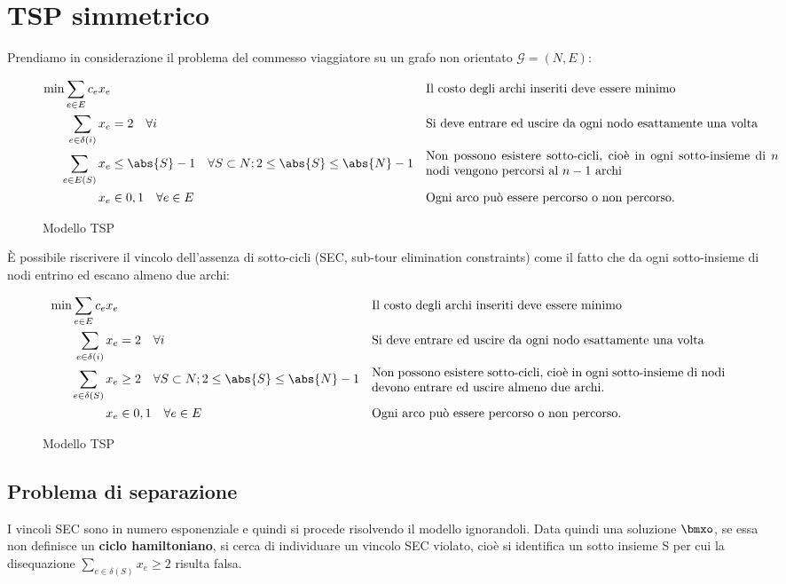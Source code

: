 \documentclass[\main/main.tex]{subfiles}
\begin{document}
\chapter{TSP simmetrico}
Prendiamo in considerazione il problema del commesso viaggiatore su un grafo non orientato \(\mathcal{G}=(N,E)\):
\begin{figure}
    \begin{align*}
        \min \sum_{e\in E} c_e x_e & &&\text{Il costo degli archi inseriti deve essere minimo}\\
        \sum_{e \in \delta(i)} x_e &= 2\quad \forall i &&\text{Si deve entrare ed uscire da ogni nodo esattamente una volta}\\
        \sum_{e \in E(S)} x_e & \leq \abs{S} - 1 \quad \forall S \subset N; 2 \leq \abs{S} \leq \abs{N} -1 && \parbox{10cm}{Non possono esistere sotto-cicli, cioè in ogni sotto-insieme di \(n\) nodi vengono percorsi al \(n-1\) archi}\\
        x_e & \in {0,1} \quad \forall e \in E && \text{Ogni arco può essere percorso o non percorso.}
    \end{align*}
    \caption{Modello TSP}
\end{figure}
È possibile riscrivere il vincolo dell'assenza di sotto-cicli (SEC, sub-tour elimination constraints) come il fatto che da ogni sotto-insieme di nodi entrino ed escano almeno due archi:
\begin{figure}
    \begin{align*}
        \min \sum_{e\in E} c_e x_e & &&\text{Il costo degli archi inseriti deve essere minimo}\\
        \sum_{e \in \delta(i)} x_e &= 2\quad \forall i &&\text{Si deve entrare ed uscire da ogni nodo esattamente una volta}\\
        \sum_{e \in \delta(S)} x_e &\geq 2 \quad \forall S \subset N; 2 \leq \abs{S} \leq \abs{N} -1 && \parbox{10cm}{Non possono esistere sotto-cicli, cioè in ogni sotto-insieme di nodi devono entrare ed uscire almeno due archi.}\\
        x_e & \in {0,1} \quad \forall e \in E && \text{Ogni arco può essere percorso o non percorso.}
    \end{align*}
    \caption{Modello TSP}
\end{figure}

\section{Problema di separazione}
I vincoli SEC sono in numero esponenziale e quindi si procede risolvendo il modello ignorandoli. Data quindi una soluzione \(\bmxo \), se essa non definisce un \textbf{ciclo hamiltoniano}, si cerca di individuare un vincolo SEC violato, cioè si identifica un sotto insieme S per cui la disequazione \(\sum_{e \in \delta(S)} x_e \geq 2\) risulta falsa.
\end{document}
